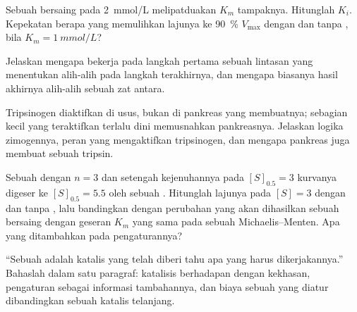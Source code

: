 \begin{exercise}[$\star\star$]\label{exo:b1:enzymes:8}
Sebuah  bersaing pada \qty{2}{mmol/L} melipatduakan $K_m$
tampaknya. Hitunglah $K_i$. Kepekatan  berapa yang memulihkan
lajunya ke \qty{90}{\%} $V_{\max}$ dengan dan tanpa , bila
$K_m = \qty{1}{mmol/L}$?
\end{exercise}

\begin{exercise}[$\star\star$]\label{exo:b1:enzymes:9}
Jelaskan mengapa  bekerja pada langkah pertama
sebuah lintasan yang menentukan alih-alih pada langkah terakhirnya, dan
mengapa  biasanya hasil akhirnya alih-alih sebuah zat
antara.
\end{exercise}

\begin{exercise}[$\star\star\star$]\label{exo:b1:enzymes:10}
Tripsinogen diaktifkan di usus, bukan di pankreas yang membuatnya;
sebagian kecil yang teraktifkan terlalu dini memusnahkan pankreasnya.
Jelaskan logika zimogennya, peran  yang mengaktifkan tripsinogen,
dan mengapa pankreas juga membuat sebuah  tripsin.
\end{exercise}

\begin{exercise}[$\star\star\star$]\label{exo:b1:enzymes:11}
Sebuah  dengan $n = 3$ dan setengah kejenuhannya pada
$[S]_{0.5}
= 3$ kurvanya digeser ke $[S]_{0.5} = 5.5$ oleh sebuah .
Hitunglah lajunya pada $[S] = 3$ dengan dan tanpa , lalu
bandingkan dengan perubahan yang akan dihasilkan sebuah 
bersaing dengan geseran $K_m$ yang sama pada sebuah 
Michaelis--Menten. Apa yang ditambahkan  pada pengaturannya?
\end{exercise}

\begin{exercise}[$\star\star\star$]\label{exo:b1:enzymes:12}
``Sebuah  adalah katalis yang telah diberi tahu apa yang harus
dikerjakannya.'' Bahaslah dalam satu paragraf: katalisis berhadapan
dengan kekhasan, pengaturan sebagai informasi tambahannya, dan biaya
sebuah  yang diatur dibandingkan sebuah katalis telanjang.
\end{exercise}

